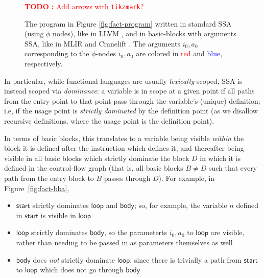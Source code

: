 \documentclass[acmsmall,screen,review]{acmart}
\newcounter{todos}
\newcommand{\TODO}[1]{{
  \stepcounter{todos}
  \begin{center}\large{\textcolor{red}{\textbf{TODO \arabic{todos}:} #1}}\end{center}
}}
\newcommand{\ms}[1]{\ensuremath{\mathsf{#1}}}
\begin{document}
\begin{figure}
  \TODO{Add arrows with \texttt{tikzmark}?}
  
  \caption{
    The program in Figure \ref{fig:fact-program} written in standard SSA (using $\phi$ nodes),
    like in LLVM \cite{llvm}, and in basic-blocks with arguments SSA, like in MLIR \cite{mlir} and
    Cranelift \cite{cranelift}. The arguments $i_0, a_0$ corresponding to the $\phi$-nodes $i_0,
    a_0$ are colored in \textcolor{red}{red} and \textcolor{blue}{blue}, respectively.
  }

  \Description{}
\end{figure}

In particular, while functional languages are usually \textit{lexically} scoped,
SSA is instead scoped via \textit{dominance}: a variable is in scope at a given
point if all paths from the entry point to that point pass through the
variable's (unique) definition; i.e, if the usage point is \textit{strictly
dominated} by the definition point (as we disallow recursive definitions, where
the usage point is the definition point).

In terms of basic blocks, this translates to a variable being visible \textit{within} the block it
is defined after the instruction which defines it, and thereafter being visible in all basic blocks
which strictly dominate the block $D$ in which it is defined in the control-flow graph (that is, all
basic blocks $B \neq D$ such that every path from the entry block to $B$ passes through $D$). For
example, in Figure~\ref{fig:fact-bba},
\begin{itemize}
  \item \ms{start} strictly dominates \ms{loop} and \ms{body}; so, for example, the variable $n$
  defined in \ms{start} is visible in \ms{loop}
  \item \ms{loop} strictly dominates \ms{body}, so the parameterts $i_0, a_0$ to \ms{loop} are
  visible, rather than needing to be passed in as parameters themselves as well
  \item \ms{body} does \textit{not} strictly dominate \ms{loop}, since there is trivially a path
  from \ms{start} to \ms{loop} which does not go through \ms{body}
\end{itemize}
\end{document}
